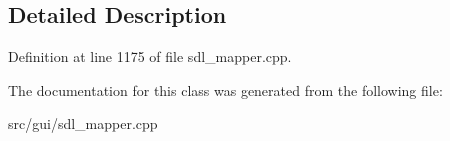 \subsection{Detailed Description}


Definition at line 1175 of file sdl\-\_\-mapper.\-cpp.



The documentation for this class was generated from the following file\-:\begin{DoxyCompactItemize}
\item 
src/gui/sdl\-\_\-mapper.\-cpp\end{DoxyCompactItemize}
